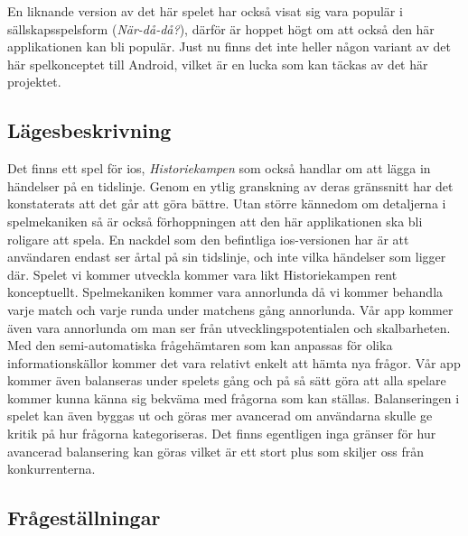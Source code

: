 \documentclass[swedish,12pt,a4paper]{article}
\begin{document}
En liknande version av det här spelet har också visat sig vara populär i sällskapsspelsform (\textit{När-då-då?})\cite{nardada}, därför är hoppet högt om att också den här applikationen kan bli populär. Just nu finns det inte heller någon variant av det här spelkonceptet till Android, vilket är en lucka som kan täckas av det här projektet.

\subsection{Lägesbeskrivning}
Det finns ett spel för ios, \textit{Historiekampen}\cite{historiekampen} som också handlar om att lägga in händelser på en tidslinje. Genom en ytlig granskning av deras gränssnitt har det konstaterats att det går att göra bättre. Utan större kännedom om detaljerna i spelmekaniken så är också förhoppningen att den här applikationen ska bli roligare att spela. En nackdel som den befintliga ios-versionen har är att användaren endast ser årtal på sin tidslinje, och inte vilka händelser som ligger där.
Spelet vi kommer utveckla kommer vara likt Historiekampen rent konceptuellt. Spelmekaniken kommer vara annorlunda då vi kommer behandla varje match och varje runda under matchens gång annorlunda. Vår app kommer även vara annorlunda om man ser från utvecklingspotentialen och skalbarheten. Med den semi-automatiska frågehämtaren som kan anpassas för olika informationskällor kommer det vara relativt enkelt att hämta nya frågor. Vår app kommer även balanseras under spelets gång och på så sätt göra att alla spelare kommer kunna känna sig bekväma med frågorna som kan ställas. Balanseringen i spelet kan även byggas ut och göras mer avancerad om användarna skulle ge kritik på hur frågorna kategoriseras. Det finns egentligen inga gränser för hur avancerad balansering kan göras vilket är ett stort plus som skiljer oss från konkurrenterna.  

\subsection{Frågeställningar}
\end{document}
